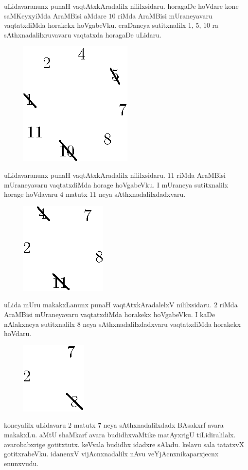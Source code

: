 uLidavaranunx punaH vaqtAtxkAradalilx nililxsidaru. horagaDe hoVdare kone saMKeyxyiMda AraMBisi aMdare $10$ riMda AraMBisi mUraneyavaru vaqtatxdiMda horakekx hoVgabeVku. eraDaneya sutitxnalilx $1$, $5$, $10$ ra sAthxnadalilxruvavaru vaqtatxda horagaDe uLidaru.
\begin{figure}[H]
\centering
\includegraphics{src/figures/fig3.eps}
\end{figure}

uLidavaranunx punaH vaqtAtxkAradalilx nililxsidaru. $11$ riMda AraMBisi mUraneyavaru vaqtatxdiMda horage hoVgabeVku. I mUraneya sutitxnalilx horage hoVdavaru $4$ matutx $11$ neya sAthxnadalilxdadxvaru. 
\begin{figure}[H]
\centering
\includegraphics{src/figures/fig4.eps}
\end{figure}

uLida mUru makakxLanunx punaH vaqtAtxkAradalelxV nililxsidaru. $2$ riMda AraMBisi mUraneyavaru vaqtatxdiMda horakekx hoVgabeVku. I kaDe nAlakxneya sutitxnalilx $8$ neya sAthxnadalilxdadxvaru vaqtatxdiMda horakekx hoVdaru.
\begin{figure}[H]
\centering
\includegraphics{src/figures/fig5.eps}
\end{figure}

koneyalilx uLidavaru $2$ matutx $7$ neya sAthxnadalilxdadx BAsakxrf avara makakxLu. aMtU shaMkarf avara budidhxvaMtike matAyxrigU tiLidiralilalx. avarobabxrige gotitxtutx. keVvala budidhx idadxre sAladu. kelavu sala tatatxvX gotitxrabeVku. idanenxV vijAcnxnadalilx nAvu veYjAcnxnikaparxjecnx enunxvudu. 
